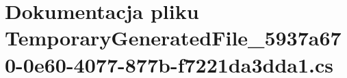 \hypertarget{_temporary_generated_file__5937a670-0e60-4077-877b-f7221da3dda1_8cs}{\section{Dokumentacja pliku Temporary\-Generated\-File\-\_\-5937a670-\/0e60-\/4077-\/877b-\/f7221da3dda1.cs}
\label{_temporary_generated_file__5937a670-0e60-4077-877b-f7221da3dda1_8cs}
}
